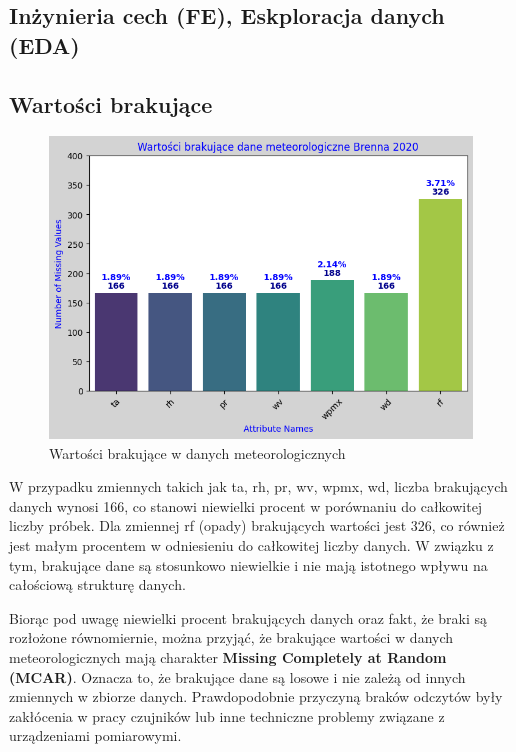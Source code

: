 \documentclass[10pt,a4paper]{article}
\begin{document}
\subsection{Inżynieria cech (FE), Eskploracja danych (EDA)}
\subsection*{Wartości brakujące}
\begin{figure}[h]
	\centering
	\includegraphics[scale=0.7]{ms_val.png}
	\caption{Wartości brakujące w danych meteorologicznych}
	\label{fig:my_label}
\end{figure}
\noindent W przypadku zmiennych takich jak ta, rh, pr, wv, wpmx, wd, liczba brakujących danych wynosi 166, co stanowi niewielki procent w porównaniu do całkowitej liczby próbek. Dla zmiennej rf (opady) brakujących wartości jest 326, co również jest małym procentem w odniesieniu do całkowitej liczby danych. W związku z tym, brakujące dane są stosunkowo niewielkie i nie mają istotnego wpływu na całościową strukturę danych.
\par
\hspace{0.75cm}
Biorąc pod uwagę niewielki procent brakujących danych oraz fakt, że braki są rozłożone równomiernie, można przyjąć, że brakujące wartości w danych meteorologicznych mają charakter \textbf{Missing Completely at Random (MCAR)}. Oznacza to, że brakujące dane są losowe i nie zależą od innych zmiennych w zbiorze danych. Prawdopodobnie przyczyną braków odczytów były zakłócenia w pracy czujników lub inne techniczne problemy związane z urządzeniami pomiarowymi.
\par
\hspace{0.75cm}
\end{document}
